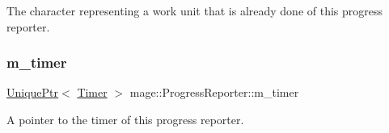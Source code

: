 The character representing a work unit that is already done of this progress reporter. \hypertarget{classmage_1_1_progress_reporter_a4c5c81ce84ceaab7764bd640a18db788}{}\label{classmage_1_1_progress_reporter_a4c5c81ce84ceaab7764bd640a18db788} 
\subsubsection{\texorpdfstring{m\+\_\+timer}{m\_timer}}
{\footnotesize\ttfamily \hyperlink{namespacemage_a3316d7143a973e37adf1110f2e80ca31}{Unique\+Ptr}$<$ \hyperlink{classmage_1_1_timer}{Timer} $>$ mage\+::\+Progress\+Reporter\+::m\+\_\+timer\hspace{0.3cm}{\ttfamily [private]}}

A pointer to the timer of this progress reporter. 
